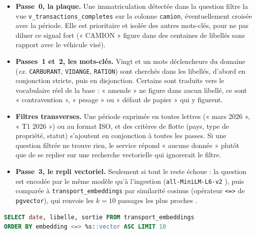 \begin{itemize}
    \item \textbf{Passe~0, la plaque.} Une immatriculation détectée dans la question filtre la vue \texttt{v\_transactions\_completes} sur la colonne \texttt{camion}, éventuellement croisée avec la période. Elle est prioritaire et isolée des autres mots-clés, pour ne pas diluer ce signal fort (« CAMION » figure dans des centaines de libellés sans rapport avec le véhicule visé).
    \item \textbf{Passes~1 et~2, les mots-clés.} Vingt et un mots déclencheurs du domaine (\textit{ex.} \texttt{CARBURANT}, \texttt{VIDANGE}, \texttt{RATION}) sont cherchés dans les libellés, d'abord en conjonction stricte, puis en disjonction. Certains sont traduits vers le vocabulaire réel de la base : « amende » ne figure dans aucun libellé, ce sont « contravention », « pesage » ou « défaut de papier » qui y figurent.
    \item \textbf{Filtres transverses.} Une période exprimée en toutes lettres (« mars 2026 », « T1 2026 ») ou au format ISO, et des critères de flotte (pays, type de propriété, statut) s'ajoutent en conjonction à toutes les passes. Si une question filtrée ne trouve rien, le service répond « aucune donnée » plutôt que de se replier sur une recherche vectorielle qui ignorerait le filtre.
    \item \textbf{Passe~3, le repli vectoriel.} Seulement si tout le reste échoue : la question est encodée par le même modèle qu'à l'ingestion (\texttt{all-MiniLM-L6-v2} \cite{reimersSentencebertSentenceEmbeddings2019}), puis comparée à \texttt{transport\_embeddings} par similarité cosinus (opérateur \texttt{<=>} de \texttt{pgvector}), qui renvoie les $k=10$ passages les plus proches \cite{karpukhinDensePassageRetrieval2020}.
\end{itemize}

\begin{lstlisting}[language=SQL, basicstyle=\ttfamily\footnotesize, breaklines=true, showstringspaces=false]
SELECT date, libelle, sortie FROM transport_embeddings
ORDER BY embedding <=> %s::vector ASC LIMIT 10
\end{lstlisting}

